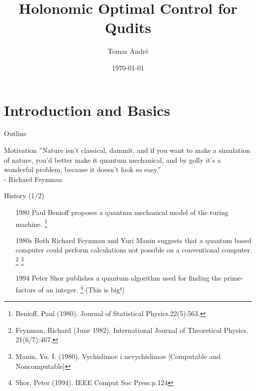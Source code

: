 \documentclass[t]{beamer}
\title[Holonomic Optimal Control for Qudits]{Holonomic Optimal Control for Qudits}
\author{ Tomas André}
\institute{ Uppsala University }
\date{\today}
\begin{document}
\begin{frame}
  \titlepage
\end{frame}


\section{Introduction and Basics}
\begin{frame}{Outline}
\tableofcontents
\end{frame}

\begin{frame}{}
\tableofcontents[ 
currentsubsection, 
hideothersubsections, 
sectionstyle=show/shaded, 
subsectionstyle=show/shaded, 
] 
\end{frame}

\begin{frame}[c]{Motivation}
''Nature isn't classical, dammit, and if you want to make a simulation of nature, you'd better make it quantum mechanical, and by golly it's a wonderful problem, because it doesn't look so easy.'' 
\\- Richard Feynman
\end{frame}

\begin{frame}{History (1/2)}


\begin{itemize}
\item[1980] Paul Benioff proposes a quantum mechanical model of the turing machine. 
\footnote{{\scriptsize Benioff, Paul (1980). Journal of Statistical Physics.22(5):563.}}


\item[1980s] Both Richard Feynman and Yuri Manin suggests that a quantum based computer could perform calculations not possible on a conventional computer.
\footnote{\scriptsize Feynman, Richard (June 1982). International Journal of Theoretical Physics. 21(6/7):467.}
\footnote{\scriptsize Manin, Yu. I. (1980). Vychislimoe i nevychislimoe [Computable and Noncomputable]}


\item[1994] Peter Shor publishes a quantum algorithm used for finding the prime-factors of an integer.
\footnote{\scriptsize Shor, Peter (1994). IEEE Comput Soc Press:p.124} (This is big!) 


\end{itemize}
\end{frame}
\end{document}

